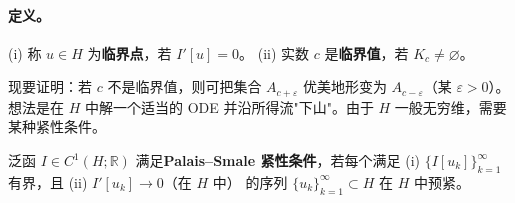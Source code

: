 \documentclass[../../main.tex]{subfiles}
\begin{document}
\paragraph{定义。}
(i) 称 $u\in H$ 为\textbf{临界点}，若 $I'[u]=0$。
(ii) 实数 $c$ 是\textbf{临界值}，若 $K_c\neq\varnothing $。

现要证明：若 $c$ 不是临界值，则可把集合 $A_{c+\varepsilon}$ 优美地形变为 $A_{c-\varepsilon}$（某 $\varepsilon>0$）。想法是在 $H$ 中解一个适当的 ODE 并沿所得流"下山"。由于 $H$ 一般无穷维，需要某种紧性条件。

\begin{definition}\label{definition:ch08-5-PalaisSmale}
泛函 $I\in C^1(H;\mathbb{R})$ 满足\textbf{Palais--Smale 紧性条件}，若每个满足
(i) $\{I[u_k]\}_{k=1}^\infty$ 有界，且
(ii) $I'[u_k]\to 0$（在 $H$ 中）
的序列 $\{u_k\}_{k=1}^\infty\subset H$ 在 $H$ 中预紧。
\end{definition}
\end{document}
